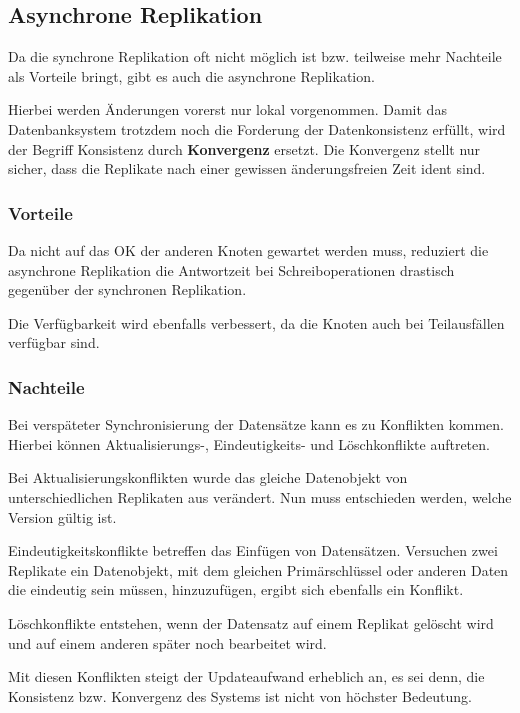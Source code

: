 \subsection{Asynchrone Replikation}

Da die synchrone Replikation oft nicht möglich ist bzw. teilweise mehr Nachteile als Vorteile bringt, gibt es auch die asynchrone Replikation.

Hierbei werden Änderungen vorerst nur lokal vorgenommen. Damit das Datenbanksystem trotzdem noch die Forderung der Datenkonsistenz erfüllt, wird der Begriff Konsistenz durch \textbf{Konvergenz} ersetzt. Die Konvergenz stellt nur sicher, dass die Replikate nach einer gewissen änderungsfreien Zeit ident sind. \cite{kaiserslautern}

\subsubsection{Vorteile}

Da nicht auf das OK der anderen Knoten gewartet werden muss, reduziert die asynchrone Replikation die Antwortzeit bei Schreiboperationen drastisch gegenüber der synchronen Replikation. \cite{kaiserslautern}

Die Verfügbarkeit wird ebenfalls verbessert, da die Knoten auch bei Teilausfällen verfügbar sind.

\subsubsection{Nachteile}
\label{syncprob}

Bei verspäteter Synchronisierung der Datensätze kann es zu Konflikten kommen. Hierbei können Aktualisierungs-, Eindeutigkeits- und Löschkonflikte auftreten.

Bei Aktualisierungskonflikten wurde das gleiche Datenobjekt von unterschiedlichen Replikaten aus verändert. Nun muss entschieden werden, welche Version gültig ist. \cite{darmstadt}

Eindeutigkeitskonflikte betreffen das Einfügen von Datensätzen. Versuchen zwei Replikate ein Datenobjekt, mit dem gleichen Primärschlüssel oder anderen Daten die eindeutig sein müssen, hinzuzufügen, ergibt sich ebenfalls ein Konflikt. \cite{darmstadt}

Löschkonflikte entstehen, wenn der Datensatz auf einem Replikat gelöscht wird und auf einem anderen später noch bearbeitet wird. \cite{darmstadt}

Mit diesen Konflikten steigt der Updateaufwand erheblich an, es sei denn, die Konsistenz bzw. Konvergenz des Systems ist nicht von höchster Bedeutung.

